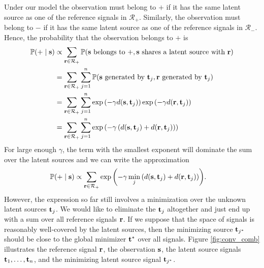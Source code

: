Under our model the observation must belong to $+$ if it has the same
latent source as one of the reference signals in $\mathcal{R}_+$. Similarly, the
observation must belong to $-$ if it has the same latent source as one of the
reference signals in $\mathcal{R}_-$. Hence, the probability that the
observation belongs to $+$ is
\begin{align}
\mathbb{P}(+ \;|\; \mathbf s) &\propto \sum_{\mathbf r \in \mathcal{R}_+} \mathbb{P}(\mathbf s \text{ belongs to } +, \mathbf s \text{ shares a latent source
  with } \mathbf r)\notag\\
&= \sum_{\mathbf r \in \mathcal{R}_+} \sum_{j = 1}^n \mathbb{P}( \mathbf s \text{ generated by }
\mathbf t_j, \mathbf r \text{ generated by } \mathbf t_j)\notag\\
&= \sum_{\mathbf r \in \mathcal{R}_+} \sum_{j = 1}^n \exp{\left(-\gamma
    d(\mathbf s,\mathbf t_j)\right)} \exp{\left(-\gamma d(\mathbf r,\mathbf t_j)\right)}\notag\\
&= \sum_{\mathbf r \in \mathcal{R}_+} \sum_{j = 1}^n \exp{\left(-\gamma\left(
    d(\mathbf s,\mathbf t_j) + d(\mathbf r,\mathbf t_j) \right)\right)}
\end{align}
For large enough $\gamma$, the term with the smallest exponent will dominate the sum
over the latent sources and we can write the approximation
\begin{align}
\mathbb{P}(+ \;|\; \mathbf s) &\propto \sum_{\mathbf r \in \mathcal{R}_+}
\exp{\left(-\gamma \min_{j} \left( d(\mathbf s,\mathbf t_j) + d(\mathbf r,\mathbf t_j) \right) \right)}. \label{eqn:prob_plus}
\end{align}
However, the expression so far still involves a minimization over the unknown
latent sources $\mathbf t_j$. We would like to eliminate the $\mathbf t_j$ altogether
and just end up with a sum over all reference signals $\mathbf r$. If we suppose
that the space of signals is reasonably well-covered by the latent sources, then
the minimizing source $\mathbf t_{j^*}$ should be close to the global minimizer
$\mathbf t^*$ over all signals. Figure \ref{fig:conv_comb} illustrates the reference
signal $\mathbf r$, the observation $\mathbf s$, the latent source signals $\mathbf t_1, \dots,
\mathbf t_n$, and the minimizing latent source signal $\mathbf t_{j^*}$.
